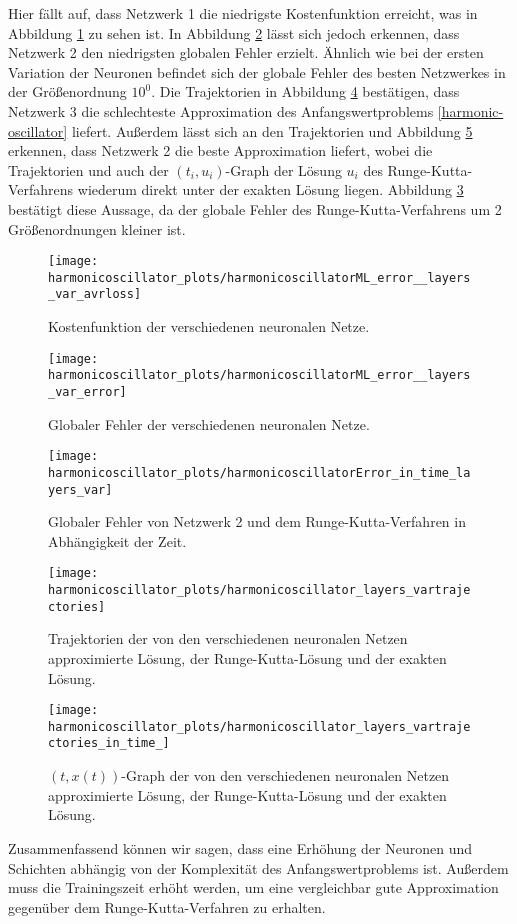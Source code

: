 Hier fällt auf, dass Netzwerk 1 die niedrigste Kostenfunktion erreicht, was in Abbildung
\ref{fig:harmonic-layers-variable-loss} zu sehen ist. In Abbildung \ref{fig:harmonic-layers-variable-error} lässt sich
jedoch erkennen, dass Netzwerk 2 den niedrigsten globalen Fehler erzielt. Ähnlich wie bei der ersten Variation der
Neuronen befindet sich der globale Fehler des besten Netzwerkes in der Größenordnung $10^0$. Die Trajektorien in
Abbildung \ref{fig:harmonic-layers-variable-trajectories} bestätigen, dass Netzwerk 3 die schlechteste Approximation des
Anfangswertproblems \eqref{harmonic-oscillator} liefert. Außerdem lässt sich an den Trajektorien und Abbildung
\ref{fig:harmonic-layers-variable-trajectories-in-time} erkennen, dass Netzwerk 2 die beste Approximation liefert,
wobei die Trajektorien und auch der $(t_i,u_i)$-Graph der Lösung $u_i$ des Runge-Kutta-Verfahrens wiederum direkt unter
der exakten Lösung liegen. Abbildung \ref{fig:harmonic-layers-variable-error-in-time} bestätigt diese Aussage, da der
globale Fehler des Runge-Kutta-Verfahrens um 2 Größenordnungen kleiner ist.
\begin{figure}
       \centering
       \texttt{[image: harmonicoscillator\_plots/harmonicoscillatorML\_error\_\_layers\_var\_avrloss]}
       \caption{Kostenfunktion der verschiedenen neuronalen Netze.}
       \label{fig:harmonic-layers-variable-loss}
\end{figure}
\begin{figure}
       \centering
       \texttt{[image: harmonicoscillator\_plots/harmonicoscillatorML\_error\_\_layers\_var\_error]}
       \caption{Globaler Fehler der verschiedenen neuronalen Netze.}
       \label{fig:harmonic-layers-variable-error}
\end{figure}
\begin{figure}
       \centering
       \texttt{[image: harmonicoscillator\_plots/harmonicoscillatorError\_in\_time\_layers\_var]}
       \caption{Globaler Fehler von Netzwerk 2 und dem Runge-Kutta-Verfahren in Abhängigkeit der Zeit.}
       \label{fig:harmonic-layers-variable-error-in-time}
\end{figure}
\begin{figure}
       \centering
       \texttt{[image: harmonicoscillator\_plots/harmonicoscillator\_layers\_vartrajectories]}
       \caption{Trajektorien der von den verschiedenen neuronalen Netzen approximierte Lösung, der Runge-Kutta-Lösung
       und der exakten Lösung.}
       \label{fig:harmonic-layers-variable-trajectories}
\end{figure}
\begin{figure}
       \centering
       \texttt{[image: harmonicoscillator\_plots/harmonicoscillator\_layers\_vartrajectories\_in\_time\_]}
       \caption{$(t,x(t))$-Graph der von den verschiedenen neuronalen Netzen approximierte Lösung, der
       Runge-Kutta-Lösung und der exakten Lösung.}
       \label{fig:harmonic-layers-variable-trajectories-in-time}
\end{figure}
Zusammenfassend können wir sagen, dass eine Erhöhung der Neuronen und Schichten abhängig von der Komplexität des
Anfangswertproblems ist. Außerdem muss die Trainingszeit erhöht werden, um eine vergleichbar gute Approximation
gegenüber dem Runge-Kutta-Verfahren zu erhalten.
\newpage

